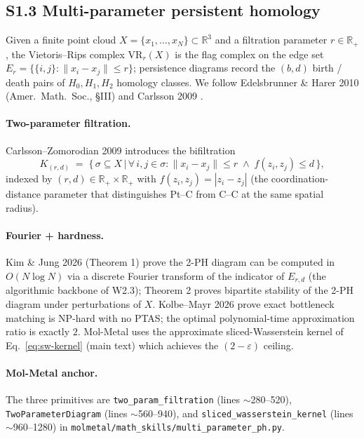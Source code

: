 \subsection*{S1.3 Multi-parameter persistent homology}
\label{supp:s1-multiph}

Given a finite point cloud $X = \{x_{1}, \ldots, x_{N}\} \subset
\mathbb{R}^{3}$ and a filtration parameter $r \in \mathbb{R}_{+}$,
the Vietoris--Rips complex $\mathrm{VR}_{r}(X)$ is the flag
complex on the edge set $E_{r} = \{ \{i, j\} : \| x_{i} - x_{j}
\| \le r \}$; persistence diagrams record the $(b, d)$ birth /
death pairs of $H_{0}, H_{1}, H_{2}$ homology classes.  We follow
Edelsbrunner \& Harer 2010 (Amer.\ Math.\ Soc., \S III) and
Carlsson 2009 \cite{carlsson2009topology}.

\paragraph{Two-parameter filtration.}
Carlsson--Zomorodian 2009 introduces the bifiltration
\begin{equation}
  \label{eq:two-param-prelim}
  K_{(r, d)} \;=\; \bigl\{\, \sigma \subseteq X \,\big|\,
        \forall\, i, j \in \sigma: \| x_{i} - x_{j} \| \le r
        \;\wedge\; f(z_{i}, z_{j}) \le d \,\bigr\},
\end{equation}
indexed by $(r, d) \in \mathbb{R}_{+} \times \mathbb{R}_{+}$ with
$f(z_{i}, z_{j}) = |z_{i} - z_{j}|$ (the coordination-distance
parameter that distinguishes Pt--C from C--C at the same spatial
radius).

\paragraph{Fourier + hardness.}
Kim \& Jung 2026 \cite{kim_jung2026multi_ph} (Theorem 1) prove the
2-PH diagram can be computed in $O(N \log N)$ via a discrete
Fourier transform of the indicator of $E_{r, d}$ (the algorithmic
backbone of W2.3); Theorem 2 proves bipartite stability of the
2-PH diagram under perturbations of $X$.  Kolbe--Mayr 2026
\cite{ph_hardness_guardrail} prove exact bottleneck matching is
NP-hard with no PTAS; the optimal polynomial-time approximation
ratio is exactly $2$.  Mol-Metal uses the approximate
sliced-Wasserstein kernel of Eq.~\eqref{eq:sw-kernel} (main text)
which achieves the $(2 - \varepsilon)$ ceiling.

\paragraph{Mol-Metal anchor.}
The three primitives are \texttt{two\_param\_filtration} (lines
$\sim$280--520), \texttt{TwoParameterDiagram} (lines $\sim$560--940),
and \texttt{sliced\_wasserstein\_kernel} (lines $\sim$960--1280)
in \texttt{molmetal/math\_skills/multi\_parameter\_ph.py}.

